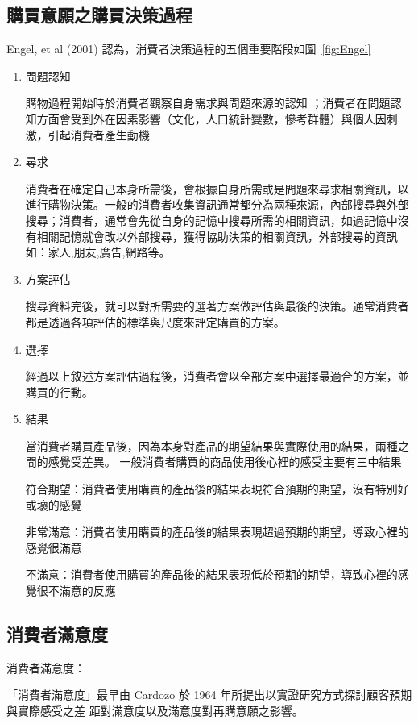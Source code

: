 \subsection{購買意願之購買決策過程}
Engel, et al (2001) 認為，消費者決策過程的五個重要階段如圖~\ref{fig:Engel}
\begin{enumerate}
\item 問題認知

購物過程開始時於消費者觀察自身需求與問題來源的認知 ；消費者在問題認知方面會受到外在因素影響（文化，人口統計變數，慘考群體）與個人因刺激，引起消費者產生動機

\item 尋求

消費者在確定自己本身所需後，會根據自身所需或是問題來尋求相關資訊，以進行購物決策。一般的消費者收集資訊通常都分為兩種來源，內部搜尋與外部搜尋；消費者，通常會先從自身的記憶中搜尋所需的相關資訊，如過記憶中沒有相關記憶就會改以外部搜尋，獲得協助決策的相關資訊，外部搜尋的資訊如：家人,朋友,廣告,網路等。
           
\item 方案評估

搜尋資料完後，就可以對所需要的選著方案做評估與最後的決策。通常消費者都是透過各項評估的標準與尺度來評定購買的方案。

\item 選擇

經過以上敘述方案評估過程後，消費者會以全部方案中選擇最適合的方案，並購買的行動。

\item 結果 

當消費者購買產品後，因為本身對產品的期望結果與實際使用的結果，兩種之間的感覺受差異。
一般消費者購買的商品使用後心裡的感受主要有三中結果

符合期望：消費者使用購買的產品後的結果表現符合預期的期望，沒有特別好或壞的感覺

非常滿意：消費者使用購買的產品後的結果表現超過預期的期望，導致心裡的感覺很滿意

不滿意：消費者使用購買的產品後的結果表現低於預期的期望，導致心裡的感覺很不滿意的反應
\end{enumerate}

\subsection{消費者滿意度}
消費者滿意度：

     「消費者滿意度」最早由 Cardozo 於 1964 年所提出以實證研究方式探討顧客預期與實際感受之差 距對滿意度以及滿意度對再購意願之影響。

